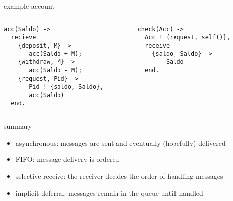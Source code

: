 \begin{frame}[fragile]{example account}

\begin{columns}
   \begin{column}{.45\linewidth}
\begin{verbatim}
acc(Saldo) ->
  recieve
    {deposit, M} ->
       acc(Saldo + M);
    {withdraw, M} ->
       acc(Saldo - M);
    {request, Pid} ->
       Pid ! {saldo, Saldo},
       acc(Saldo)
  end.
\end{verbatim}
\end{column}
\pause
   \begin{column}{.45\linewidth}
\begin{verbatim}
check(Acc) ->
  Acc ! {request, self()},
  receive
    {saldo, Saldo} ->
        Saldo
  end.
\end{verbatim}
\end{column}
\end{columns}
\end{frame}

\begin{frame}{summary}

\begin{itemize}
\item asynchronous: messages are sent and eventually (hopefully) delivered
\item FIFO: message delivery is ordered
\item selective receive: the receiver decides the order of handling messages
\item implicit deferral: messages remain in the queue untill handled
\end{itemize}

\end{frame}






